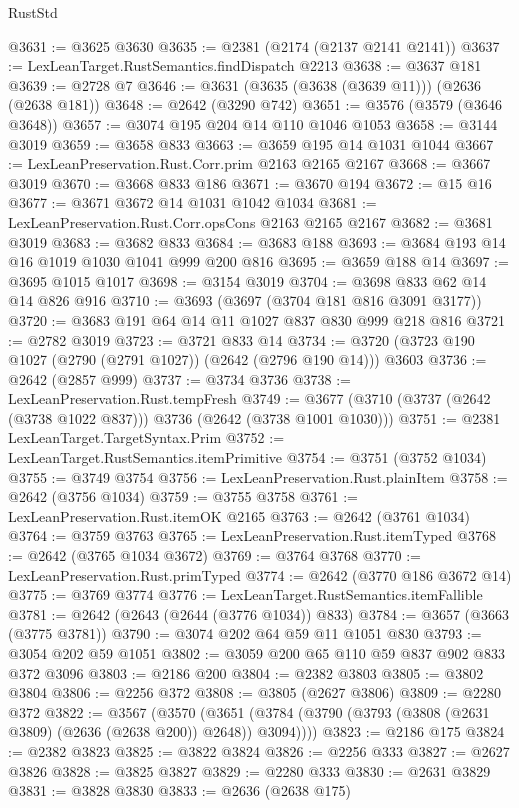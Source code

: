 \begin{lexlean}{RustStd}
\begin{coremodule}
@3631 := @3625 @3630
@3635 := @2381 (@2174 (@2137 @2141 @2141))
@3637 := LexLeanTarget.RustSemantics.findDispatch @2213
@3638 := @3637 @181
@3639 := @2728 @7
@3646 := @3631 (@3635 (@3638 (@3639 @11))) (@2636 (@2638 @181))
@3648 := @2642 (@3290 @742)
@3651 := @3576 (@3579 (@3646 @3648))
@3657 := @3074 @195 @204 @14 @110 @1046 @1053
@3658 := @3144 @3019
@3659 := @3658 @833
@3663 := @3659 @195 @14 @1031 @1044
@3667 := LexLeanPreservation.Rust.Corr.prim @2163 @2165 @2167
@3668 := @3667 @3019
@3670 := @3668 @833 @186
@3671 := @3670 @194
@3672 := @15 @16
@3677 := @3671 @3672 @14 @1031 @1042 @1034
@3681 := LexLeanPreservation.Rust.Corr.opsCons @2163 @2165 @2167
@3682 := @3681 @3019
@3683 := @3682 @833
@3684 := @3683 @188
@3693 := @3684 @193 @14 @16 @1019 @1030 @1041 @999 @200 @816
@3695 := @3659 @188 @14
@3697 := @3695 @1015 @1017
@3698 := @3154 @3019
@3704 := @3698 @833 @62 @14 @14 @826 @916
@3710 := @3693 (@3697 (@3704 @181 @816 @3091 @3177))
@3720 := @3683 @191 @64 @14 @11 @1027 @837 @830 @999 @218 @816
@3721 := @2782 @3019
@3723 := @3721 @833 @14
@3734 := @3720 (@3723 @190 @1027 (@2790 (@2791 @1027)) (@2642 (@2796 @190 @14))) @3603
@3736 := @2642 (@2857 @999)
@3737 := @3734 @3736
@3738 := LexLeanPreservation.Rust.tempFresh
@3749 := @3677 (@3710 (@3737 (@2642 (@3738 @1022 @837))) @3736 (@2642 (@3738 @1001 @1030)))
@3751 := @2381 LexLeanTarget.TargetSyntax.Prim
@3752 := LexLeanTarget.RustSemantics.itemPrimitive
@3754 := @3751 (@3752 @1034)
@3755 := @3749 @3754
@3756 := LexLeanPreservation.Rust.plainItem
@3758 := @2642 (@3756 @1034)
@3759 := @3755 @3758
@3761 := LexLeanPreservation.Rust.itemOK @2165
@3763 := @2642 (@3761 @1034)
@3764 := @3759 @3763
@3765 := LexLeanPreservation.Rust.itemTyped
@3768 := @2642 (@3765 @1034 @3672)
@3769 := @3764 @3768
@3770 := LexLeanPreservation.Rust.primTyped
@3774 := @2642 (@3770 @186 @3672 @14)
@3775 := @3769 @3774
@3776 := LexLeanTarget.RustSemantics.itemFallible
@3781 := @2642 (@2643 (@2644 (@3776 @1034)) @833)
@3784 := @3657 (@3663 (@3775 @3781))
@3790 := @3074 @202 @64 @59 @11 @1051 @830
@3793 := @3054 @202 @59 @1051
@3802 := @3059 @200 @65 @110 @59 @837 @902 @833 @372 @3096
@3803 := @2186 @200
@3804 := @2382 @3803
@3805 := @3802 @3804
@3806 := @2256 @372
@3808 := @3805 (@2627 @3806)
@3809 := @2280 @372
@3822 := @3567
    (@3570 (@3651 (@3784 (@3790 (@3793 (@3808 (@2631 @3809) (@2636 (@2638 @200)) @2648)) @3094))))
@3823 := @2186 @175
@3824 := @2382 @3823
@3825 := @3822 @3824
@3826 := @2256 @333
@3827 := @2627 @3826
@3828 := @3825 @3827
@3829 := @2280 @333
@3830 := @2631 @3829
@3831 := @3828 @3830
@3833 := @2636 (@2638 @175)

\end{coremodule}
\end{lexlean}
